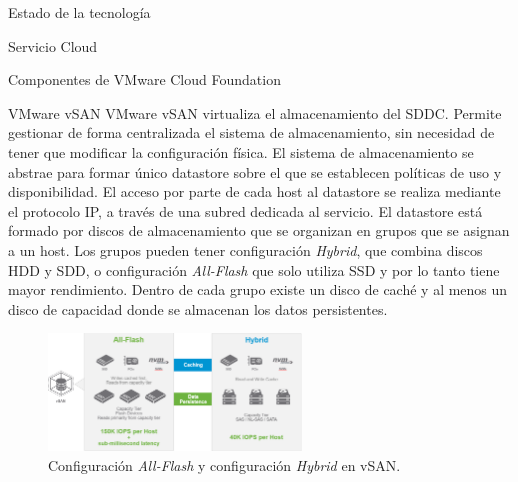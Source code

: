\begin{chapter}{Estado de la tecnología}
\begin{section}{Servicio Cloud}
\begin{subsection}{Componentes de VMware Cloud Foundation}
    \begin{subsubsection}{VMware vSAN}
        VMware vSAN virtualiza el almacenamiento del SDDC. Permite gestionar de forma centralizada el sistema de almacenamiento, sin necesidad de tener que modificar la configuración física. El sistema de almacenamiento se abstrae para formar único datastore sobre el que se establecen políticas de uso y disponibilidad. El acceso por parte de cada host al datastore se realiza mediante el protocolo IP, a través de una subred dedicada al servicio. El datastore está formado por discos de almacenamiento que se organizan en grupos que se asignan a un host. Los grupos pueden tener configuración \textit{Hybrid}, que combina discos HDD y SDD, o configuración \textit{All-Flash} que solo utiliza SSD y por lo tanto tiene mayor rendimiento. Dentro de cada grupo existe un disco de caché y al menos un disco de capacidad donde se almacenan los datos persistentes\cite{operacionesVSAN}. 
        
        \begin{figure}[h]
        \centering
            \includegraphics[width=0.6\textwidth]{imaxes/cap2recursos/rendimientoVSAN.png}
            \caption{Configuración \textit{All-Flash} y configuración \textit{Hybrid} en vSAN.}
            \label{fig:performance-Hybrid-AllFlash-vSAN}
        \end{figure}
        \FloatBarrier
    \end{subsubsection}
    

\end{subsection}
\end{section}
\end{chapter}
